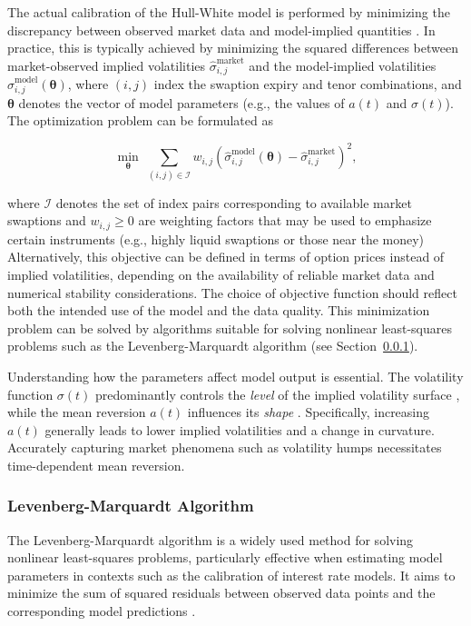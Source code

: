 The actual calibration of the Hull-White model is performed by minimizing the discrepancy between observed market data and model-implied quantities \parencite[p.~2]{alaya2021deep}. In practice, this is typically achieved by minimizing the squared differences between market-observed implied volatilities $\hat{\sigma}^{\text{market}}_{i,j}$ and the model-implied volatilities $\hat{\sigma}^{\text{model}}_{i,j}(\boldsymbol{\theta})$, where $(i,j)$ index the swaption expiry and tenor combinations, and $\boldsymbol{\theta}$ denotes the vector of model parameters (e.g., the values of $a(t)$ and $\sigma(t)$). The optimization problem can be formulated as

\begin{equation}
	\min_{\boldsymbol{\theta}} \; \sum_{(i,j) \in \mathcal{I}} w_{i,j} \left( \hat{\sigma}^{\text{model}}_{i,j}(\boldsymbol{\theta}) - \hat{\sigma}^{\text{market}}_{i,j} \right)^2,
\end{equation}

where $\mathcal{I}$ denotes the set of index pairs corresponding to available market swaptions and $w_{i,j} \geq 0$ are weighting factors that may be used to emphasize certain instruments (e.g., highly liquid swaptions or those near the money)  Alternatively, this objective can be defined in terms of option prices instead of implied volatilities, depending on the availability of reliable market data and numerical stability considerations. The choice of objective function should reflect both the intended use of the model and the data quality. This minimization problem can be solved by algorithms suitable for solving nonlinear least-squares problems such as the Levenberg-Marquardt algorithm (see Section~\ref{lm_algorithm}).

Understanding how the parameters affect model output is essential. The volatility function $\sigma(t)$ predominantly controls the \emph{level} of the implied volatility surface \parencite[p.~9]{gurrieri2009calibration}, while the mean reversion $a(t)$ influences its \emph{shape} \parencite[p.~9]{gurrieri2009calibration}. Specifically, increasing $a(t)$ generally leads to lower implied volatilities and a change in curvature. Accurately capturing market phenomena such as volatility humps necessitates time-dependent mean reversion.

\subsubsection{Levenberg-Marquardt Algorithm} \label{lm_algorithm}
The Levenberg-Marquardt algorithm is a widely used method for solving nonlinear least-squares problems, particularly effective when estimating model parameters in contexts such as the calibration of interest rate models. It aims to minimize the sum of squared residuals between observed data points and the corresponding model predictions \parencite{marquardt1963}.

